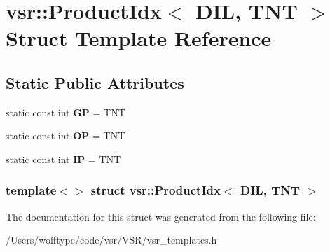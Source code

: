 \hypertarget{structvsr_1_1_product_idx_3_01_d_i_l_00_01_t_n_t_01_4}{\section{vsr\-:\-:Product\-Idx$<$ D\-I\-L, T\-N\-T $>$ Struct Template Reference}
\label{structvsr_1_1_product_idx_3_01_d_i_l_00_01_t_n_t_01_4}
}
\subsection*{Static Public Attributes}
\begin{DoxyCompactItemize}
\item 
\hypertarget{structvsr_1_1_product_idx_3_01_d_i_l_00_01_t_n_t_01_4_a509a807afc89e0bef3662d9d900ad9f3}{static const int {\bfseries G\-P} = T\-N\-T}\label{structvsr_1_1_product_idx_3_01_d_i_l_00_01_t_n_t_01_4_a509a807afc89e0bef3662d9d900ad9f3}

\item 
\hypertarget{structvsr_1_1_product_idx_3_01_d_i_l_00_01_t_n_t_01_4_ad1f5133559c50f752df4cd6f24c1d7bb}{static const int {\bfseries O\-P} = T\-N\-T}\label{structvsr_1_1_product_idx_3_01_d_i_l_00_01_t_n_t_01_4_ad1f5133559c50f752df4cd6f24c1d7bb}

\item 
\hypertarget{structvsr_1_1_product_idx_3_01_d_i_l_00_01_t_n_t_01_4_a6ea1a8fcff5fe46bb0c08c63abc20116}{static const int {\bfseries I\-P} = T\-N\-T}\label{structvsr_1_1_product_idx_3_01_d_i_l_00_01_t_n_t_01_4_a6ea1a8fcff5fe46bb0c08c63abc20116}

\end{DoxyCompactItemize}
\subsubsection*{template$<$$>$ struct vsr\-::\-Product\-Idx$<$ D\-I\-L, T\-N\-T $>$}



The documentation for this struct was generated from the following file\-:\begin{DoxyCompactItemize}
\item 
/\-Users/wolftype/code/vsr/\-V\-S\-R/vsr\-\_\-templates.\-h\end{DoxyCompactItemize}

